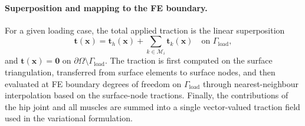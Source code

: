 \paragraph{Superposition and mapping to the FE boundary.}
For a given loading case, the total applied traction is the linear superposition
\begin{equation}
\mathbf{t}(\mathbf{x})=\mathbf{t}_h(\mathbf{x}) + \sum_{k\in\mathcal{M}_i}\mathbf{t}_k(\mathbf{x})
\quad \text{on } \Gamma_{\mathrm{load}},
\label{eq:traction_superposition}
\end{equation}
and $\mathbf{t}(\mathbf{x})=\mathbf{0}$ on $\partial\Omega\setminus\Gamma_{\mathrm{load}}$.
The traction is first computed on the surface triangulation, transferred from surface elements to surface nodes, and then evaluated at FE boundary degrees of freedom on $\Gamma_{\mathrm{load}}$ through nearest-neighbour interpolation based on the surface-node tractions. Finally, the contributions of the hip joint and all muscles are summed into a single vector-valued traction field used in the variational formulation.
